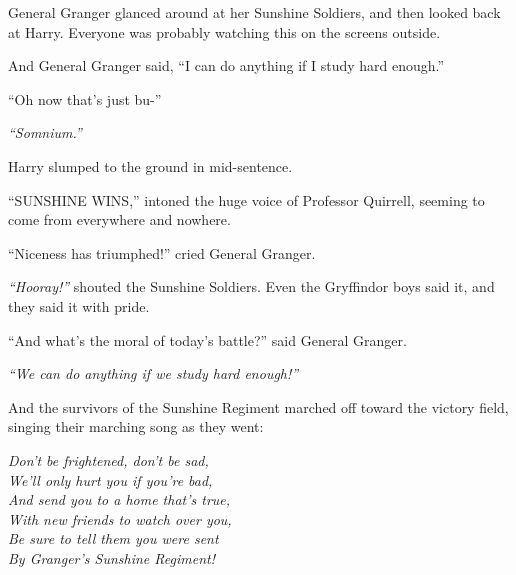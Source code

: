 General Granger glanced around at her Sunshine Soldiers, and then looked
back at Harry. Everyone was probably watching this on the screens
outside.

And General Granger said, ``I can do anything if I study hard enough.''

``Oh now that's just bu-''

\emph{``Somnium.''}

Harry slumped to the ground in mid-sentence.

``SUNSHINE WINS,'' intoned the huge voice of Professor Quirrell, seeming
to come from everywhere and nowhere.

``Niceness has triumphed!'' cried General Granger.

\emph{``Hooray!''} shouted the Sunshine Soldiers. Even the Gryffindor
boys said it, and they said it with pride.

``And what's the moral of today's battle?'' said General Granger.

\emph{``We can do anything if we study hard enough!''}

And the survivors of the Sunshine Regiment marched off toward the
victory field, singing their marching song as they went:

\emph{Don't be frightened, don't be sad,}\\\emph{We'll only hurt you if
you're bad,}\\\emph{And send you to a home that's true,}\\\emph{With new
friends to watch over you,}\\\emph{Be sure to tell them you were
sent}\\\emph{By Granger's Sunshine Regiment!}
